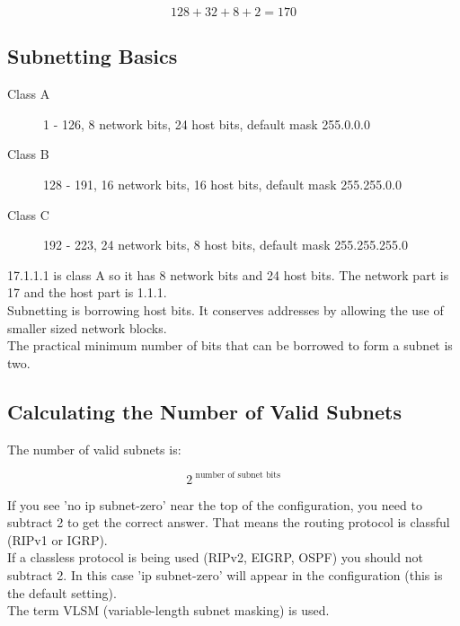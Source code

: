 \begin{equation}
128 + 32 + 8 + 2 = 170
\end{equation}

\subsection{Subnetting Basics}

\begin{description}
  
\item[Class A]
1 - 126, 8 network bits, 24 host bits, default mask 255.0.0.0
\item[Class B]
128 - 191, 16 network bits, 16 host bits, default mask 255.255.0.0
\item[Class C]
192 - 223, 24 network bits, 8 host bits, default mask 255.255.255.0

\end{description}

17.1.1.1 is class A so it has 8 network bits and 24 host bits. The network
part is 17 and the host part is 1.1.1.\\

Subnetting is borrowing host bits. It conserves addresses by allowing the
use of smaller sized network blocks.\\

The practical minimum number of bits that can be borrowed to form a subnet
is two.

\subsection{Calculating the Number of Valid Subnets}

The number of valid subnets is:

\begin{equation}
2 ^ {\mbox{ number of subnet bits}}
\end{equation}

If you see 'no ip subnet-zero' near the top of the configuration, you need to
subtract 2 to get the correct answer. That means the routing protocol is
classful (RIPv1 or IGRP).\\

If a classless protocol is being used (RIPv2, EIGRP, OSPF) you should not
subtract 2. In this case 'ip subnet-zero' will appear in the configuration
(this is the default setting).\\

The term VLSM (variable-length subnet masking) is used.\\

